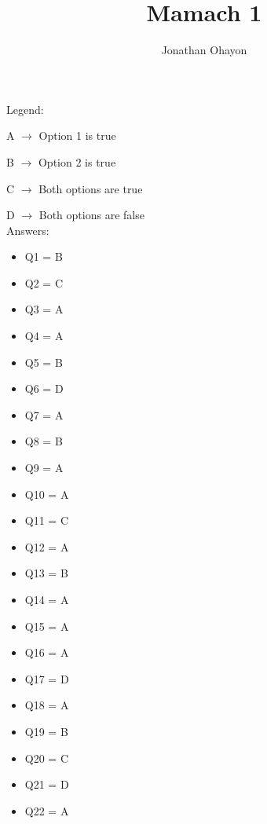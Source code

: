 \documentclass[12pt, oneside]{article}
\title{Mamach 1}
\author{Jonathan Ohayon}
\begin{document}
\maketitle

Legend:\par
A $\rightarrow$ Option 1 is true\par
B $\rightarrow$ Option 2 is true\par
C $\rightarrow$ Both options are true\par
D $\rightarrow$ Both options are false\\

Answers:
\begin{itemize}
\item Q1 = B
\item Q2 = C
\item Q3 = A
\item Q4 = A
\item Q5 = B
\item Q6 = D
\item Q7 = A
\item Q8 = B
\item Q9 = A
\item Q10 = A
\item Q11 = C
\item Q12 = A
\item Q13 = B
\item Q14 = A
\item Q15 = A
\item Q16 = A
\item Q17 = D
\item Q18 = A
\item Q19 = B
\item Q20 = C
\item Q21 = D
\item Q22 = A
\end{itemize}
\end{document}
